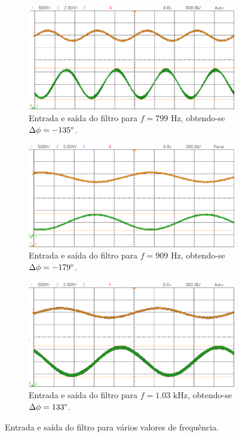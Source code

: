 \begin{figure}[ht]
    \centering
     \begin{subfigure}[b]{0.45\textwidth}
         \centering
         \includegraphics[width=\textwidth]{Imagens/fci.png}
         \caption{Entrada e saída do filtro para $f = 799$ Hz, obtendo-se $\Delta\phi = -135\degree$.}
     \end{subfigure}
     
     \begin{subfigure}[b]{0.45\textwidth}
         \centering
         \includegraphics[width=\textwidth]{Imagens/f0.png}
         \caption{Entrada e saída do filtro para $f = 909$ Hz, obtendo-se $\Delta\phi = -179\degree$.}
     \end{subfigure}
     \begin{subfigure}[b]{0.45\textwidth}
         \centering
         \includegraphics[width=\textwidth]{Imagens/fcs.png}
         \caption{Entrada e saída do filtro para $f = 1.03$ kHz, obtendo-se $\Delta\phi = 133\degree$.}
     \end{subfigure}
    \hfill
    \caption{Entrada e saída do filtro para vários valores de frequência.}
    \label{fig:ocsl_freqs}
\end{figure}

